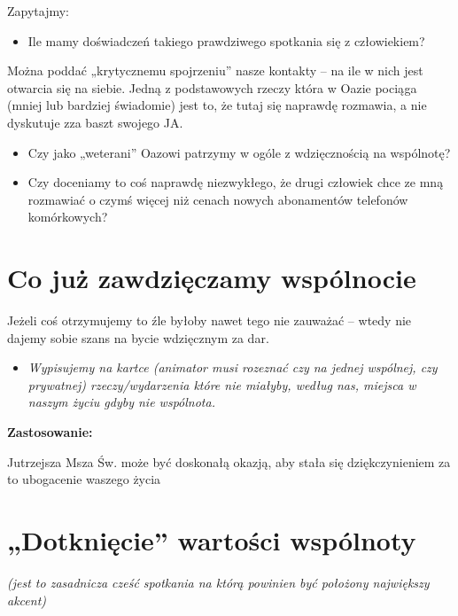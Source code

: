 \documentclass[a5paper,10pt,polish]{book}
\begin{document}
Zapytajmy:
\begin{itemize}
\item {} 
Ile mamy doświadczeń takiego prawdziwego spotkania się z człowiekiem?

\end{itemize}

Można poddać „krytycznemu spojrzeniu” nasze kontakty – na ile w nich jest otwarcia się na siebie. Jedną z podstawowych rzeczy która w Oazie pociąga (mniej lub bardziej świadomie) jest to, że tutaj się naprawdę rozmawia, a nie dyskutuje zza baszt swojego JA.
\begin{itemize}
\item {} 
Czy jako „weterani” Oazowi patrzymy w ogóle z wdzięcznością na wspólnotę?

\item {} 
Czy doceniamy to coś naprawdę niezwykłego, że drugi człowiek chce ze mną rozmawiać o czymś więcej niż cenach nowych abonamentów telefonów komórkowych?

\end{itemize}


\section{Co już zawdzięczamy wspólnocie}
\label{babice2006-jesien-gliwice/spotkanie1:co-juz-zawdzieczamy-wspolnocie}
Jeżeli coś otrzymujemy to źle byłoby nawet tego nie zauważać – wtedy nie dajemy sobie szans na bycie wdzięcznym za dar.
\begin{itemize}
\item {} 
\emph{Wypisujemy na kartce (animator musi rozeznać czy na jednej wspólnej, czy prywatnej) rzeczy/wydarzenia które nie miałyby, według nas, miejsca w naszym życiu gdyby nie wspólnota.}

\end{itemize}

\begin{DUlineblock}{0em}
\item[] \textbf{Zastosowanie:}
\item[] Jutrzejsza Msza Św. może być doskonałą okazją, aby stała się dziękczynieniem za to ubogacenie waszego życia
\end{DUlineblock}


\section{„Dotknięcie” wartości wspólnoty}
\label{babice2006-jesien-gliwice/spotkanie1:dotkniecie-wartosci-wspolnoty}
\emph{(jest to zasadnicza cześć spotkania na którą powinien być położony największy akcent)}
\end{document}
